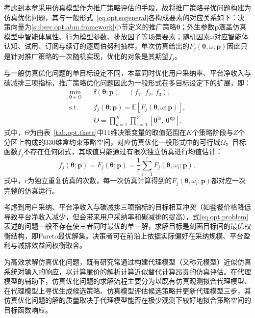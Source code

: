 考虑到本章采用仿真模型作为推广策略评估的手段，故将推广策略寻优问题构建为仿真优化问题，其与一般形式~\eqref{eq.opt.sogeneral}各构成要素的对应关系如下：决策向量为\ref{subsec.opt.abm.framework}小节定义的推广策略$\bm{\theta}$；外生参数$\bm{p}$涵盖仿真模型中智能体属性、行为模型参数、排放因子等场景要素；随机因素$\omega$对应智能体认知、试用、订阅与续订的逐周伯努利抽样，单次仿真给出的$F_{j}\left(\bm{\theta},\omega;\bm{p}\right)$因此只是针对推广策略的一次随机实现，优化的对象是其期望$f_{j}$。

与一般仿真优化问题的单目标设定不同，本章同时优化用户采纳率、平台净收入与碳减排三项指标，推广策略优化问题因此为一般形式在多目标设定下的扩展，即：
\begin{equation}
\begin{aligned}
\min_{\bm{\theta}\in\Theta}\quad
&\bm{f}\left(\bm{\theta};\bm{p}\right)
=\left(f_{1},\,f_{2},\,f_{3}\right),\\
\text{s.t.}\quad
&f_{j}\left(\bm{\theta};\bm{p}\right)
=\mathbb{E}\left[F_{j}\left(\bm{\theta},\omega;\bm{p}\right)\right],\\
&\Theta
=\prod_{k=1}^{K}\prod_{z=1}^{Z}
\left[\bm{\theta}^{\mathrm{lo}},\,\bm{\theta}^{\mathrm{up}}\right].
\end{aligned}
\label{eq.opt.problem}
\end{equation}
式中，$\Theta$为由表~\ref{tab.opt.theta}中11维决策变量的取值范围在$K$个策略阶段与$Z$个分区上构成的330维盒约束策略空间，对应仿真优化一般形式中的可行域$\Omega$。目标函数$f_{j}$不存在任何闭式，其取值只能通过有限次独立仿真进行均值估计：
\begin{equation}
f_{j}\left(\bm{\theta};\bm{p}\right) = \bar{F}_{j}\left(\bm{\theta};\bm{p}\right)=\frac{1}{r}\sum_{i=1}^{r}F_{j}\left(\bm{\theta},\omega_{i};\bm{p}\right),
\label{eq.opt.sampleavg}
\end{equation}
式中，$r$为独立重复仿真的次数，每一次仿真计算得到的$F_{j}\left(\bm{\theta},\omega_{i};\bm{p}\right)$都对应一次完整的仿真运行。

考虑到用户采纳、平台净收入与碳减排三项指标的目标相互冲突（如套餐价格降低导致平台净收入减少，但会带来用户采纳率和碳减排的提高），式\eqref{eq.opt.problem}表述的问题一般不存在使三者同时最优的单一解，求解目标是刻画目标间的最优权衡结构，即Pareto最优解集。决策者可在前沿上依据实际偏好在采纳规模、平台盈利与减排效益间权衡取舍。

为高效求解仿真优化问题，既有研究常通过构建代理模型（又称元模型）近似仿真系统对输入的响应，以计算廉价的解析计算近似替代计算昂贵的仿真评估\citep{osorioSimulationBasedOptimizationFramework2013}。在代理模型的辅助下，仿真优化问题的求解流程主要分为以既有仿真观测拟合代理模型、在代理模型上寻优生成候选策略、仿真模型评估候选策略并更新代理模型三步，其仿真优化问题的解的质量取决于代理模型能否在极少观测下较好地拟合策略空间的目标函数响应\citep{osorioSimulationBasedOptimizationFramework2013}。

